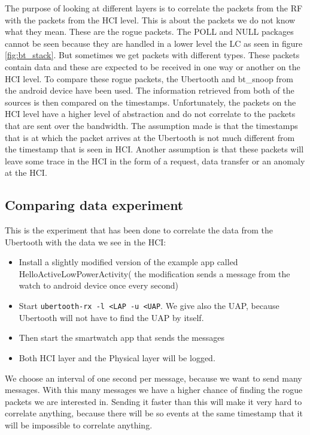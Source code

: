 The purpose of looking at different layers is to correlate the packets from the RF with the packets from the HCI level. This is about the packets we do not know what they mean. These are the rogue packets. The POLL and NULL packages cannot be seen because they are handled in a lower level the LC as seen in figure \ref{fig:bt_stack}. But sometimes we get packets with different types. These packets contain data and these are expected to be received in one way or another on the HCI level. To compare these rogue packets, the Ubertooth and bt\_snoop from the android device have been used. The information retrieved from both of the sources is then compared on the timestamps. Unfortunately, the packets on the HCI level have a higher level of abstraction and do not correlate to the packets that are sent over the bandwidth. The assumption made is that the timestamps that is at which the packet arrives at the Ubertooth is not much different from the timestamp that is seen in HCI. Another assumption is that these packets will leave some trace in the HCI in the form of a request, data transfer or an anomaly at the HCI.
\subsection{Comparing data experiment}
This is the experiment that has been done to correlate the data from the Ubertooth with the data we see in the HCI:
\begin{itemize}
\item Install a slightly modified version of the example app called HelloActiveLowPowerActivity( the modification sends a message from the watch to android device once every second)
\item Start \verb|ubertooth-rx -l <LAP -u <UAP|. We give also the UAP, because Ubertooth will not have to find the UAP by itself. 
\item Then start the smartwatch app that sends the messages
\item Both HCI layer and the Physical layer will be logged.
\end{itemize}
We choose an interval of one second per message, because we want to send many messages. With this many messages we have a higher chance of finding the rogue packets we are interested in. Sending it faster than this will make it very hard to correlate anything, because there will be so events at the same timestamp that it will be impossible to correlate anything.
